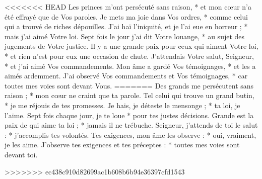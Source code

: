 <<<<<<< HEAD
Les princes m'ont persécuté sans raison, * et mon cœur n'a été effrayé que de Vos paroles.
\versseparator
Je mets ma joie dans Vos ordres, * comme celui qui a trouvé de riches dépouilles.
\versseparator
J'ai haï l'iniquité, et je l'ai eue en horreur ; * mais j'ai aimé Votre loi.
\versseparator
Sept fois le jour j'ai dit Votre louange, * au sujet des jugements de Votre justice.
\versseparator
Il y a une grande paix pour ceux qui aiment Votre loi, * et rien n'est pour eux une occasion de chute.
\versseparator
J'attendais Votre salut, Seigneur, * et j'ai aimé Vos commandements.
\versseparator
Mon âme a gardé Vos témoignages, * et les a aimés ardemment.
\versseparator
J'ai observé Vos commandements et Vos témoignages, * car toutes mes voies sont devant Vous.
=======
Des grands me persécutent sans raison ; *
mon cœur ne craint que ta parole.
\versseparator
Tel celui qui trouve un grand butin, *
je me réjouis de tes promesses.
\versseparator
Je hais, je déteste le mensonge ; *
ta loi, je l’aime.
\versseparator
Sept fois chaque jour, je te loue *
pour tes justes décisions.
\versseparator
Grande est la paix de qui aime ta loi ; *
jamais il ne trébuche.
\versseparator
Seigneur, j’attends de toi le salut : *
j’accomplis tes volontés.
\versseparator
Tes exigences, mon âme les observe : *
oui, vraiment, je les aime.
\versseparator
J’observe tes exigences et tes préceptes : *
toutes mes voies sont devant toi.

>>>>>>> ec438c910d82699ac1b608b6b94e36397cfd1543
